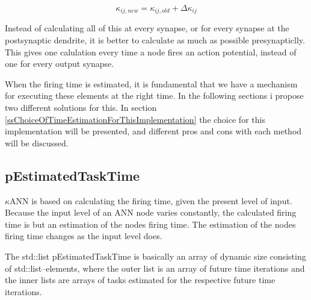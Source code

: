 	\begin{equation}
		\kappa_{ij, new} = \kappa_{ij, old} + \Delta \kappa_{ij}
	\end{equation}

	Instead of calculating all of this at every synapse, or for every synapse at the postsynaptic dendrite, it is better to calculate as much as possible presynapticlly.
	This gives one calulation every time a node fires an action potential, instead of one for every output synapse.

	




	When the firing time is estimated, it is fundamental that we have a mechanism for executing these elements at the right time. 
	In the following sections i propose two different solutions for this. 
	In section \ref{ssChoiceOfTimeEstimationForThisImplementation} the choice for this implementation will be presented, and different pros and cons with each method will be discussed.



	
	\subsection{pEstimatedTaskTime}
	$\kappa$ANN is based on calculating the firing time, given the present level of input. 
	Because the input level of an ANN node varies constantly, the calculated firing time is but an estimation of the nodes firing time. 
	The estimation of the nodes firing time changes as the input level does.
	
	The std::list pEstimatedTaskTime is basically an array of dynamic size consisting of std::list--elements,
	where the outer list is an array of future time iterations and the inner lists are arrays of tasks estimated for the respective future time iterations.

